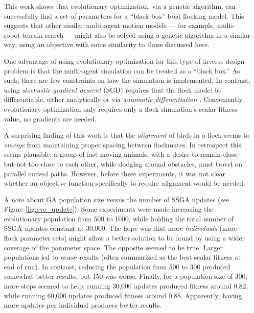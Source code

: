 \documentclass[letterpaper]{article}
\begin{document}
This work shows that evolutionary optimization, via a genetic algorithm, can successfully find a set of parameters for a ``black box'' boid flocking model. This suggests that other similar multi-agent motion models --- for example, multi-robot terrain search --- might also be solved using a genetic algorithm in a similar way, using an objective with some similarity to those discussed here.

One advantage of using evolutionary optimization for this type of inverse design problem is that the multi-agent simulation can be treated as a ``black box.'' As such, there are few constraints on how the simulation is implemented. In contrast, using \textit{stochastic gradient descent} (SGD) \citep{robbins_stochastic_1951} requires that the flock model be differentiable, either analytically or via \textit{automatic differentiation} \citep{baydin_automatic_2018}. Conveniently, evolutionary optimization only requires only a flock simulation's scalar fitness value, no gradients are needed.

A surprising finding of this work is that the \textit{alignment} of birds in a flock seems to \textit{emerge} from maintaining proper spacing between flockmates. In retrospect this seems plausible: a group of fast moving animals, with a desire to remain close-but-not-too-close to each other, while dodging around obstacles, must travel on parallel curved paths. However, before these experiments, it was not clear whether an objective function specifically to require alignment would be needed.

A note about GA population size versus the number of SSGA updates (see Figure \ref{fig:evo_update}). Some experiments were made increasing the evolutionary population from 500 to 1000, while holding the total number of SSGA updates constant at 30,000. The hope was that more \textit{individuals} (more flock parameter sets) might allow a better solution to be found by using a wider coverage of the parameter space. The opposite seemed to be true. Larger populations led to worse results (often summarized as the best scalar fitness at end of run). In contrast, reducing the population from 500 to 300 produced somewhat better results, but 150 was worse. Finally, for a population size of 300, more steps seemed to help: running 30,000 updates produced fitness around 0.82, while running 60,000 updates produced fitness around 0.88. Apparently, having more updates per individual produces better results.

\end{document}
